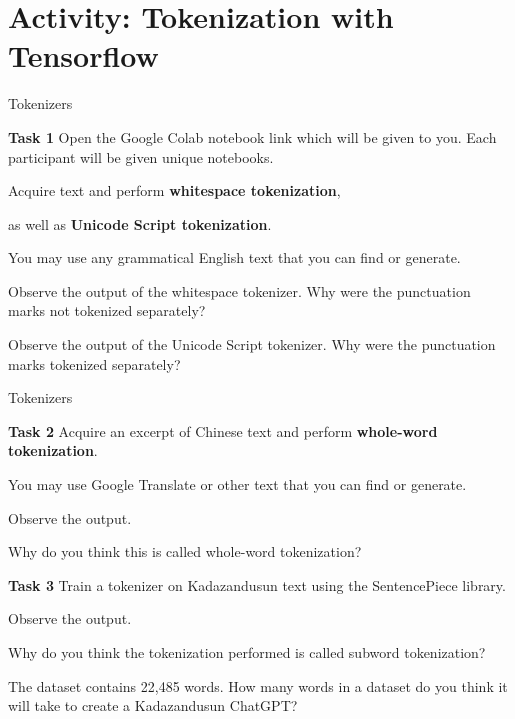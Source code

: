 \documentclass[UKenglish]{beamer}
\begin{document}
\section{Activity: Tokenization with Tensorflow}
\SectionPage

\begin{frame}{Tokenizers}
  \begin{alertblock}{\textbf{Task 1}}
      Open the Google Colab notebook link which will be given to you. Each participant will be given unique notebooks. \par \vspace{5pt}
      Acquire text and perform \textbf{whitespace tokenization}, \par as well as \textbf{Unicode Script tokenization}. \par \vspace{5pt}
      You may use any \alert{grammatical English} text that you can find or generate. \par \vspace{5pt}
      Observe the output of the \alert{whitespace tokenizer}. Why were the punctuation marks not tokenized separately? \par
      Observe the output of the \alert{Unicode Script tokenizer}. Why were the punctuation marks tokenized separately?
  \end{alertblock}

\end{frame}

\begin{frame}{Tokenizers}
     \begin{alertblock}{\textbf{Task 2}}
      Acquire an excerpt of Chinese text and perform \textbf{whole-word tokenization}. \par \vspace{5pt}
      \alert{You may use Google Translate} or other text that you can find or generate. 
      \par \vspace{5pt}
      Observe the output.
      \par
      Why do you think this is called whole-word tokenization?
  \end{alertblock}

    \begin{alertblock}{\textbf{Task 3}}
        Train a tokenizer on Kadazandusun text using the SentencePiece library. \par \vspace{5pt}
        Observe the output.
        \par
        Why do you think the tokenization performed is called subword tokenization? \par
        The dataset contains 22,485 words. How many words in a dataset do you think it will take to create a Kadazandusun ChatGPT?
    \end{alertblock}

\end{frame}
\end{document}
